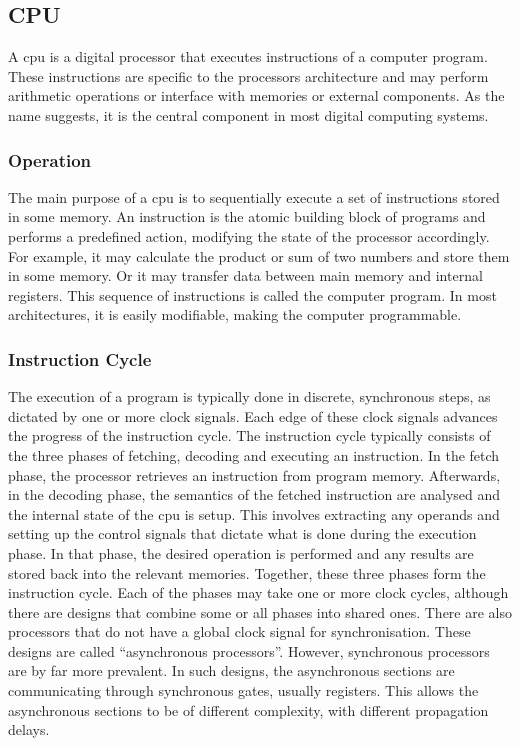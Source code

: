 \subsection{CPU}

A \ac{cpu} is a digital processor that executes instructions of a computer program. These instructions are specific to the processors architecture and may perform arithmetic operations or interface with memories or external components. As the name suggests, it is the central component in most digital computing systems.

\subsubsection{Operation}

The main purpose of a \ac{cpu} is to sequentially execute a set of instructions stored in some memory. An instruction is the atomic building block of programs and performs a predefined action, modifying the state of the processor accordingly. For example, it may calculate the product or sum of two numbers and store them in some memory. Or it may transfer data between main memory and internal registers. This sequence of instructions is called the computer program. In most architectures, it is easily modifiable, making the computer programmable.

\subsubsection{Instruction Cycle}

The execution of a program is typically done in discrete, synchronous steps, as dictated by one or more clock signals. Each edge of these clock signals advances the progress of the instruction cycle. The instruction cycle typically consists of the three phases of fetching, decoding and executing an instruction. In the fetch phase, the processor retrieves an instruction from program memory. Afterwards, in the decoding phase, the semantics of the fetched instruction are analysed and the internal state of the \ac{cpu} is setup. This involves extracting any operands and setting up the control signals that dictate what is done during the execution phase. In that phase, the desired operation is performed and any results are stored back into the relevant memories. Together, these three phases form the instruction cycle. Each of the phases may take one or more clock cycles, although there are designs that combine some or all phases into shared ones. There are also processors that do not have a global clock signal for synchronisation. These designs are called ``asynchronous processors''. However, synchronous processors are by far more prevalent. In such designs, the asynchronous sections are communicating through synchronous gates, usually registers. This allows the asynchronous sections to be of different complexity, with different propagation delays.

